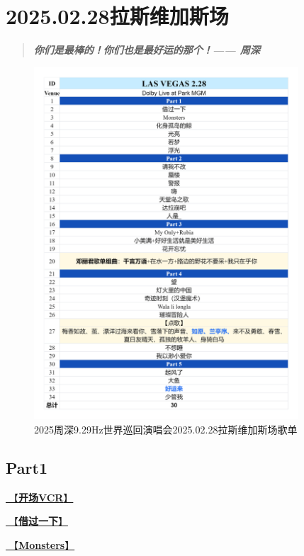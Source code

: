 \documentclass[]{ctexbook}
\begin{document}
\chapter{2025.02.28拉斯维加斯场}\label{LasVegas-20250228}

\begin{quote}
\textbf{\emph{你们是最棒的！你们也是最好运的那个！------ 周深}}
\end{quote}

\begin{figure}

{\centering \includegraphics[width=280pt]{img/playlists/playlists-lasvegas-20250228} 

}

\caption{2025周深9.29Hz世界巡回演唱会2025.02.28拉斯维加斯场歌单}\label{fig:unnamed-chunk-173}
\end{figure}

\newpage

\section{Part1}\label{LasVegas-20250228-part1}

\hyperref[opening-vcr]{🎥【\textbf{开场VCR}】}

\hyperref[I-will-go-my-way]{🎵【\textbf{借过一下}】}

\hyperref[Monsters]{🎵【\textbf{Monsters}】}
\end{document}
